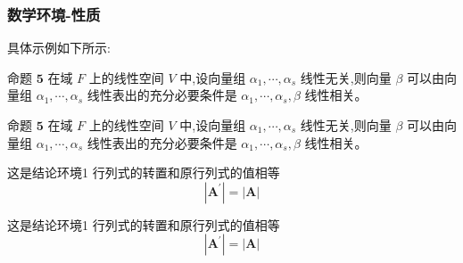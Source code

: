 \subsubsection{数学环境-性质}
具体示例如下所示:
\begin{property}
    命题 $\mathbf{5}$ 在域 $F$ 上的线性空间 $V$ 中,设向量组 $\alpha_{1}, \cdots, \alpha_{s}$ 线性无关,则向量 $\beta$ 可以由向 量组 $\alpha_{1}, \cdots, \alpha_{s}$ 线性表出的充分必要条件是 $\alpha_{1}, \cdots, \alpha_{s}, \beta$ 线性相关。
\end{property}
\begin{tcblisting}{}
\begin{property}
    命题 $\mathbf{5}$ 在域 $F$ 上的线性空间 $V$ 中,设向量组 $\alpha_{1}, \cdots, \alpha_{s}$ 线性无关,则向量 $\beta$ 可以由向 量组 $\alpha_{1}, \cdots, \alpha_{s}$ 线性表出的充分必要条件是 $\alpha_{1}, \cdots, \alpha_{s}, \beta$ 线性相关。
\end{property}
\end{tcblisting}
\begin{conclusion}
    这是结论环境1 行列式的转置和原行列式的值相等
    $$\left|\boldsymbol{A}^{\prime}\right|=|\boldsymbol{A}|$$
\end{conclusion}
\begin{tcblisting}{}
\begin{conclusion}
    这是结论环境1 行列式的转置和原行列式的值相等
    $$\left|\boldsymbol{A}^{\prime}\right|=|\boldsymbol{A}|$$
\end{conclusion}
\end{tcblisting}
%
